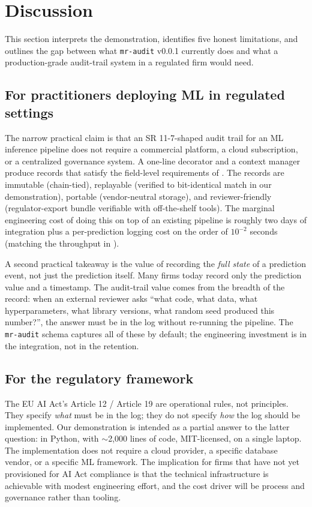 \section{Discussion}\label{sec:discussion}

This section interprets the demonstration, identifies five honest limitations, and outlines the gap between what \texttt{mr-audit} v0.0.1 currently does and what a production-grade audit-trail system in a regulated firm would need.

\subsection{For practitioners deploying ML in regulated settings}

The narrow practical claim is that an SR 11-7-shaped audit trail for an ML inference pipeline does not require a commercial platform, a cloud subscription, or a centralized governance system. A one-line decorator and a context manager produce records that satisfy the field-level requirements of . The records are immutable (chain-tied), replayable (verified to bit-identical match in our demonstration), portable (vendor-neutral storage), and reviewer-friendly (regulator-export bundle verifiable with off-the-shelf tools). The marginal engineering cost of doing this on top of an existing pipeline is roughly two days of integration plus a per-prediction logging cost on the order of $10^{-2}$ seconds (matching the throughput in ).

A second practical takeaway is the value of recording the \emph{full state} of a prediction event, not just the prediction itself. Many firms today record only the prediction value and a timestamp. The audit-trail value comes from the breadth of the record: when an external reviewer asks ``what code, what data, what hyperparameters, what library versions, what random seed produced this number?'', the answer must be in the log without re-running the pipeline. The \texttt{mr-audit} schema captures all of these by default; the engineering investment is in the integration, not in the retention.

\subsection{For the regulatory framework}

The EU AI Act's Article 12 / Article 19 are operational rules, not principles. They specify \emph{what} must be in the log; they do not specify \emph{how} the log should be implemented. Our demonstration is intended as a partial answer to the latter question: in Python, with $\sim$2,000 lines of code, MIT-licensed, on a single laptop. The implementation does not require a cloud provider, a specific database vendor, or a specific ML framework. The implication for firms that have not yet provisioned for AI Act compliance is that the technical infrastructure is achievable with modest engineering effort, and the cost driver will be process and governance rather than tooling.

